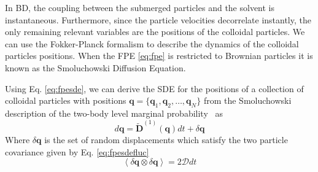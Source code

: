 \documentclass[ twoside,openright,titlepage,numbers=noenddot,%
headinclude,footinclude,cleardoublepage=empty,abstract=on,
BCOR=5mm,paper=b5,fontsize=11pt, dvipsnames
]{scrreprt}
\renewcommand{\vec}[1]{\bm{#1}}
\newcommand{\tens}[1]{\bm{\mathcal{#1}}}
\newcommand{\ppos}{q}
\begin{document}
In \gls{BD}, the coupling between the submerged particles and the solvent is instantaneous.
Furthermore, since the particle velocities decorrelate instantly, the only remaining relevant variables are the positions of the colloidal particles. We can use the Fokker-Planck formalism to describe the dynamics of the colloidal particles positions. When the \gls{FPE} \eqref{eq:fpe} is restricted to Brownian particles it is known as the Smoluchowski Diffusion Equation.

Using Eq. \eqref{eq:fpesde}, we can derive the \gls{SDE} for the positions of a collection of colloidal particles with positions $\vec{q} =\{\vec{q}_1,\vec{q}_2,\dots, \vec{q}_N\}$ from the Smoluchowski description of the two-body level marginal probability~\cite{Dhont1996} as
\begin{equation}
  \label{eq:bdlange}
  d\vec{\ppos} = \widetilde{\vec{D}}^{(1)}(\vec{\ppos})dt + \delta\vec{\ppos}
\end{equation}
Where $\delta\vec{q}$ is the set of random displacements which satisfy the two particle covariance given by Eq. \eqref{eq:fpesdefluc} 
\begin{equation}
  \label{eq:bdfluc}
  \left\langle \delta\vec{\ppos}\otimes \delta\vec{\ppos}\right\rangle = 2\tens{D} dt
\end{equation}
\end{document}
